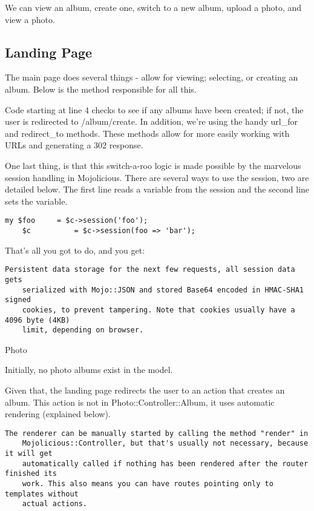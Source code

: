 \documentclass[14pt]{extreport}
\begin{document}
We can view an album, create one, switch to a new album, upload a photo, and
view a photo.

\subsection{Landing Page}

The main page does several things - allow for viewing; selecting, or creating
an album.  Below is the method responsible for all this.



Code starting at line 4 checks to see if any albums have been created; if not,
the user is redirected to /album/create.  In addition, we're using the handy
url\_for and redirect\_to methods. These methods allow for more easily working
with URLs and generating a 302 response.

One last thing, is that this switch-a-roo logic is made possible by the
marvelous session handling in Mojolicious.  There are several ways to use the
session, two are detailed below.  The first line reads a variable from the
session and the second line sets the variable.

\begin{lstlisting}[style=BlockStyle]
    my $foo     = $c->session('foo');
    $c          = $c->session(foo => 'bar');
\end{lstlisting}

That's all you got to do, and you get:

\begin{lstlisting}[style=BlockStyle]
    Persistent data storage for the next few requests, all session data gets
    serialized with Mojo::JSON and stored Base64 encoded in HMAC-SHA1 signed
    cookies, to prevent tampering. Note that cookies usually have a 4096 byte (4KB)
    limit, depending on browser.
\end{lstlisting}

{\Large Photo}

Initially, no photo albums exist in the model.

Given that, the landing page redirects the user to an action that creates an
album.  This action is not in Photo::Controller::Album, it uses automatic
rendering (explained below).

\begin{lstlisting}[style=BlockStyle]
    The renderer can be manually started by calling the method "render" in
    Mojolicious::Controller, but that's usually not necessary, because it will get
    automatically called if nothing has been rendered after the router finished its
    work. This also means you can have routes pointing only to templates without
    actual actions.
\end{lstlisting}
\end{document}
